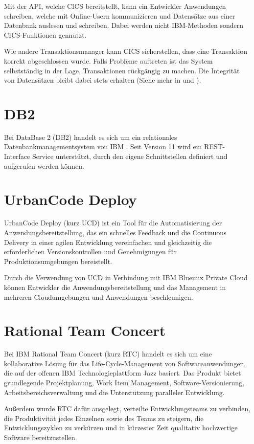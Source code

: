 Mit der API, welche CICS bereitstellt, kann ein Entwickler Anwendungen schreiben, welche mit Online-Usern kommunizieren
und Datensätze aus einer Datenbank auslesen und schreiben. Dabei werden nicht IBM-Methoden sondern CICS-Funktionen
gennutzt.

Wie andere Transaktionsmanager kann CICS sicherstellen, dass eine Transaktion korrekt abgeschlossen wurde. Falls Probleme
auftreten ist das System selbstständig in der Lage, Transaktionen rückgängig zu machen. Die Integrität von
Datensätzen bleibt dabei stets erhalten (Siehe mehr in \cite{book_grundlagen_cics} und \cite{online_grundlagen_cics}).

\section{DB2}
Bei DataBase 2 (DB2) handelt es sich um ein relationales Datenbankmanagementsystem von IBM \cite{book_grundlagen_db2}.
Seit Version 11 wird ein REST-Interface Service unterstützt, durch den eigene Schnittstellen definiert und aufgerufen
werden können.

\section{UrbanCode Deploy}
UrbanCode Deploy (kurz UCD) ist ein Tool für die Automatisierung der Anwendungsbereitstellung, das ein schnelles Feedback
und die Continuous Delivery in einer agilen Entwicklung vereinfachen und gleichzeitig die erforderlichen Versionskontrollen
und Genehmigungen für Produktionsumgebungen bereistellt.

Durch die Verwendung von UCD in Verbindung mit IBM Bluemix Private Cloud können Entwickler die Anwendungsbereitstellung
und das Management in mehreren Cloudumgebungen und Anwendungen beschleunigen.

\section{Rational Team Concert}
Bei IBM Rational Team Concert (kurz RTC) handelt es sich um eine kollaborative Lösung für das Life-Cycle-Management von
Softwareanwendungen, die auf der offenen IBM Technologieplattform Jazz basiert. Das Produkt bietet grundlegende
Projektplanung, Work Item Management, Software-Versionierung, Arbeitsbereichsverwaltung und die Unterstützung paralleler
Entwicklung.

Außerdem wurde RTC dafür ausgelegt, verteilte Entwicklungsteams zu verbinden, die Produktivität jedes Einzelnen sowie des
Teams zu steigern, die Entwicklungszyklen zu verkürzen und in kürzester Zeit qualitativ hochwertige Software bereitzustellen.

